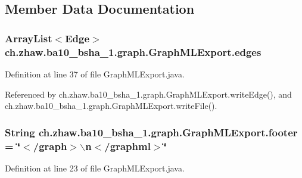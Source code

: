 \subsection{Member Data Documentation}
\hypertarget{classch_1_1zhaw_1_1ba10__bsha__1_1_1graph_1_1GraphMLExport_ac3ec3e5c8c6aed88cf7788cc043b4537}{
\subsubsection[{edges}]{\setlength{\rightskip}{0pt plus 5cm}ArrayList$<${\bf Edge}$>$ {\bf ch.zhaw.ba10\_\-bsha\_\-1.graph.GraphMLExport.edges}}}
\label{classch_1_1zhaw_1_1ba10__bsha__1_1_1graph_1_1GraphMLExport_ac3ec3e5c8c6aed88cf7788cc043b4537}


Definition at line 37 of file GraphMLExport.java.

Referenced by ch.zhaw.ba10\_\-bsha\_\-1.graph.GraphMLExport.writeEdge(), and ch.zhaw.ba10\_\-bsha\_\-1.graph.GraphMLExport.writeFile().\hypertarget{classch_1_1zhaw_1_1ba10__bsha__1_1_1graph_1_1GraphMLExport_a9c60598286723614922d49364b21b500}{
\subsubsection[{footer}]{\setlength{\rightskip}{0pt plus 5cm}String {\bf ch.zhaw.ba10\_\-bsha\_\-1.graph.GraphMLExport.footer} = \char`\"{}$<$/graph$>$$\backslash$n$<$/graphml$>$\char`\"{}}}
\label{classch_1_1zhaw_1_1ba10__bsha__1_1_1graph_1_1GraphMLExport_a9c60598286723614922d49364b21b500}


Definition at line 23 of file GraphMLExport.java.

